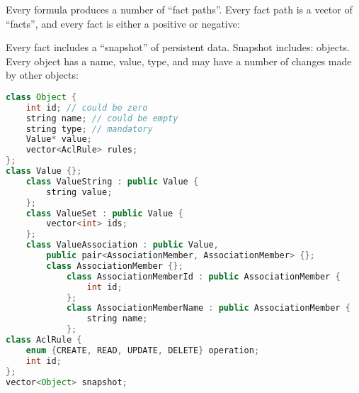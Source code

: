 \documentclass{article}
\begin{document}
    Every formula produces a number of ``fact paths''. Every fact path
    is a vector of ``facts'', and every fact is either a positive or negative:


    Every fact includes a ``snapshot'' of persistent data. Snapshot includes:
    objects. Every object
    has a name, value, type,
    and may have a number of changes made by other objects:

    \begin{lstlisting}[language=Java]
class Object {
    int id; // could be zero
    string name; // could be empty
    string type; // mandatory
    Value* value;
    vector<AclRule> rules;
};
class Value {};
    class ValueString : public Value {
        string value;
    };
    class ValueSet : public Value {
        vector<int> ids;
    };
    class ValueAssociation : public Value,
        public pair<AssociationMember, AssociationMember> {};
        class AssociationMember {};
            class AssociationMemberId : public AssociationMember {
                int id;
            };
            class AssociationMemberName : public AssociationMember {
                string name;
            };
class AclRule {
    enum {CREATE, READ, UPDATE, DELETE} operation;
    int id;
};
vector<Object> snapshot;
\end{lstlisting}
\end{document}
